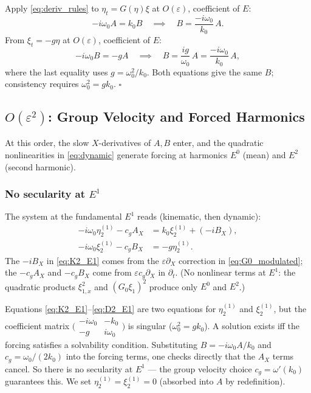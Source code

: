 \documentclass[11pt]{article}
\newcommand{\eps}{\varepsilon}
\begin{document}
Apply \eqref{eq:deriv_rules} to $\eta_t = G(\eta)\xi$ at $O(\eps)$, coefficient of $E$:
\[
-i\omega_0 A = k_0 B
\quad\implies\quad
B = \frac{-i\omega_0}{k_0}\,A.
\]
From $\xi_t = -g\eta$ at $O(\eps)$, coefficient of $E$:
\[
-i\omega_0 B = -gA
\quad\implies\quad
B = \frac{ig}{\omega_0}\,A = \frac{-i\omega_0}{k_0}\,A,
\]
where the last equality uses $g = \omega_0^2/k_0$.
Both equations give the same $B$; consistency requires
$\omega_0^2 = gk_0$. \hfill$\square$


\subsection{$O(\eps^2)$: Group Velocity and Forced Harmonics}

At this order, the slow $X$-derivatives of $A, B$ enter, and the
quadratic nonlinearities in \eqref{eq:dynamic} generate forcing at
harmonics $E^0$ (mean) and $E^2$ (second harmonic).

\subsubsection{No secularity at $E^1$}

The system at the fundamental $E^1$ reads (kinematic, then dynamic):
\begin{align}
-i\omega_0\eta_2^{(1)} - c_g A_X
&= k_0\xi_2^{(1)} + (-iB_X), \label{eq:K2_E1}\\[4pt]
-i\omega_0\xi_2^{(1)} - c_g B_X
&= -g\eta_2^{(1)}. \label{eq:D2_E1}
\end{align}
The $-iB_X$ in \eqref{eq:K2_E1} comes from
the $\eps\partial_X$ correction in \eqref{eq:G0_modulated};
the $-c_g A_X$ and $-c_g B_X$ come from
$\eps c_g\partial_X$ in $\partial_t$.
(No nonlinear terms at $E^1$:
the quadratic products $\xi_{1,x}^2$ and $(G_0\xi_1)^2$ produce
only $E^0$ and $E^2$.)

Equations \eqref{eq:K2_E1}--\eqref{eq:D2_E1} are two equations for
$\eta_2^{(1)}$ and $\xi_2^{(1)}$, but the coefficient matrix
$\bigl(\begin{smallmatrix} -i\omega_0 & -k_0 \\
-g & i\omega_0 \end{smallmatrix}\bigr)$
is singular ($\omega_0^2 = gk_0$).
A solution exists iff the forcing satisfies a solvability condition.
Substituting $B = -i\omega_0 A/k_0$ and $c_g = \omega_0/(2k_0)$
into the forcing terms, one checks directly that the $A_X$ terms cancel.
So there is no secularity at $E^1$ --- the group velocity choice
$c_g = \omega'(k_0)$ guarantees this.
We set $\eta_2^{(1)} = \xi_2^{(1)} = 0$ (absorbed into $A$ by redefinition).
\end{document}
